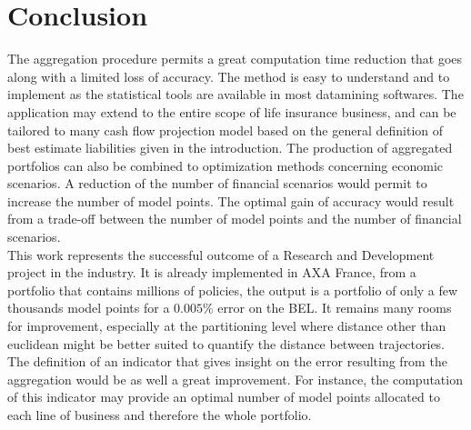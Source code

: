 \section{Conclusion}
The aggregation procedure permits a great computation time reduction that goes along with a limited loss of accuracy. The method is easy to understand and to implement as the statistical tools are available in most datamining softwares. The application may extend to the entire scope of life insurance business, and can be tailored to many cash flow projection model based on the general definition of best estimate liabilities given in the introduction. The production of aggregated portfolios can also be combined to optimization methods concerning economic scenarios. A reduction of the number of financial scenarios would permit to increase the number of model points. The optimal gain of accuracy would result from a trade-off between the number of model points and the number of financial scenarios.\\ 
This work represents the successful outcome of a Research and Development project in the industry. It is already implemented in AXA France, from a portfolio that contains millions of policies, the output is a portfolio of only a few thousands model points for a $0.005\%$ error on the BEL. It remains many rooms for improvement, especially at the partitioning level where distance other than euclidean might be better suited to quantify the distance between trajectories. The definition of an indicator that gives insight on the error resulting from the aggregation would be as well a great improvement. For instance, the computation of this indicator may provide an optimal number of model points allocated to each line of business and therefore the whole portfolio. 



